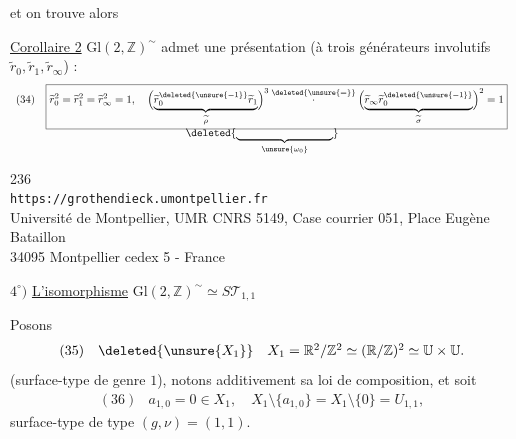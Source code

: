 
et on trouve alors

\uline{Corollaire 2} $\mathrm{Gl}(2,\mathbb Z)^{\sim}$ admet une présentation (à trois générateurs involutifs $\widetilde r_0,\widetilde r_1,\widetilde r_\infty$) :
\[
\begin{array}{ll}
(34)&\boxed{\widetilde r_0^2=\widetilde r_1^2=\widetilde r_\infty^2=1,\quad
\Bigl(\underbrace{\widetilde r_0^{\deleted{\unsure{-1}}}\widetilde r_1}_{\widetilde\rho}\Bigr)^3
\overset{\deleted{\unsure{=}}}{\cdot}
\Bigl(\underbrace{\widetilde r_\infty\widetilde r_0^{\deleted{\unsure{-1}}}}_{\widetilde\sigma}\Bigr)^2=1}\\[-2pt]
&\hspace{13em}\deleted{\underbrace{\hspace{9em}}_{\unsure{\omega_0}}}
\end{array}
\]


\begin{center}
236\\
\texttt{https://grothendieck.umontpellier.fr}\\
Université de Montpellier, UMR CNRS 5149, Case courrier 051, Place Eugène Bataillon\\
34095 Montpellier cedex 5 - France
\end{center}


$4^\circ)$ \uline{L'isomorphisme} $\mathrm{Gl}(2,\mathbb Z)^{\sim}\simeq S\mathcal T_{1,1}$

\margin{$\unsure{\checkmark}$}
Posons
\[
\begin{array}{ll}
(35)&\deleted{\unsure{X_1}}\quad X_1=\mathbb R^2/\mathbb Z^2\simeq(\mathbb R/\mathbb Z)^2\simeq\mathbb U\times\mathbb U.
\end{array}
\]
(surface-type de genre $1$), notons additivement sa loi de composition, et soit
\[
\begin{array}{ll}
(36)&a_{1,0}=0\in X_1,\quad X_1\setminus\{a_{1,0}\}=X_1\setminus\{0\}=U_{1,1},
\end{array}
\]
surface-type de type $(g,\nu)=(1,1)$.


